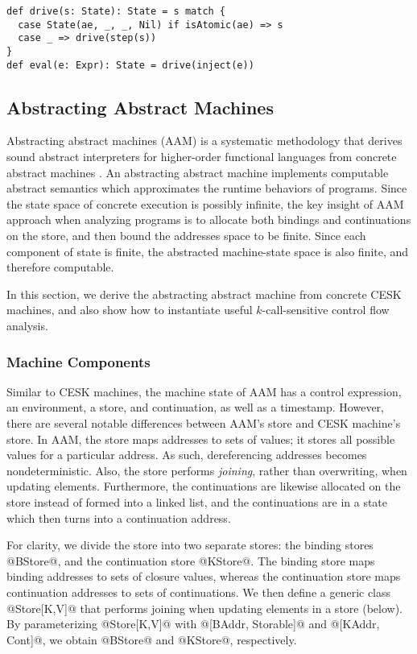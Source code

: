 \documentclass[acmsmall,review,anonymous]{acmart}\settopmatter{printfolios=true,printccs=false,printacmref=false}
\begin{document}
\begin{lstlisting}
def drive(s: State): State = s match {
  case State(ae, _, _, Nil) if isAtomic(ae) => s
  case _ => drive(step(s))
}
def eval(e: Expr): State = drive(inject(e))
\end{lstlisting}

\subsection{Abstracting Abstract Machines} \label{aam}
Abstracting abstract machines (AAM) is a systematic methodology that derives sound
abstract interpreters for higher-order functional languages from concrete
abstract machines \cite{van2012systematic, van2010abstracting}.
An abstracting abstract machine implements computable abstract semantics which
approximates the runtime behaviors of programs.
Since the state space of concrete execution is possibly infinite,
the key insight of AAM approach when analyzing programs is to allocate both bindings
and continuations on the store, and then bound the addresses space to be finite.
Since each component of state is finite,
the abstracted machine-state space is also finite, and therefore computable.

In this section, we derive the abstracting abstract machine from concrete
CESK machines, and also show how to instantiate
useful $k$-call-sensitive control flow analysis.

\subsubsection{Machine Components}

Similar to CESK machines, the machine state of AAM has a control expression,
an environment, a store, and continuation, as well as a timestamp.
However, there are several notable differences between AAM's store and CESK machine's store.
In AAM, the store maps addresses to sets of values; it stores all possible values
for a particular address. As such, dereferencing addresses becomes nondeterministic.
Also, the store performs \emph{joining}, rather than overwriting, when updating elements.
Furthermore, the continuations are likewise allocated on the store instead of formed into a
linked list, and the continuations are in a state which then turns into a continuation
address.

For clarity, we divide the store into two separate stores: the binding stores @BStore@, and
the continuation store @KStore@.
The binding store maps binding addresses to sets of closure values, whereas the continuation
store maps continuation addresses to sets of continuations.
We then define a generic class @Store[K,V]@ that performs joining when updating elements
in a store (below). By parameterizing @Store[K,V]@ with @[BAddr, Storable]@ and
@[KAddr, Cont]@, we obtain @BStore@ and @KStore@, respectively.
\end{document}
